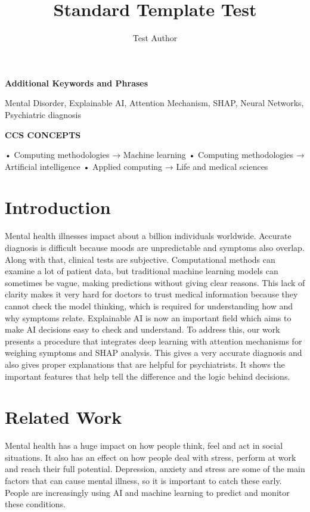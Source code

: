 \documentclass{article}
\begin{document}
\title{Standard Template Test}
\author{Test Author}
\maketitle

\textbf{Additional Keywords and Phrases}

Mental Disorder, Explainable AI, Attention Mechanism, SHAP, Neural Networks, Psychiatric diagnosis

\textbf{CCS CONCEPTS}

• Computing methodologies → Machine learning • Computing methodologies → Artificial intelligence • Applied computing → Life and medical sciences

\section{Introduction}

Mental health illnesses impact about a billion individuals worldwide. Accurate diagnosis is difficult because moods are unpredictable and symptoms also overlap. Along with that, clinical tests are subjective. Computational methods can examine a lot of patient data, but traditional machine learning models can sometimes be vague, making predictions without giving clear reasons. This lack of clarity makes it very hard for doctors to trust medical information because they cannot check the model thinking, which is required for understanding how and why symptoms relate. Explainable AI is now an important field which aims to make AI decisions easy to check and understand. To address this, our work presents a procedure that integrates deep learning with attention mechanisms for weighing symptoms and SHAP analysis. This gives a very accurate diagnosis and also gives proper explanations that are helpful for psychiatrists. It shows the important features that help tell the difference and the logic behind decisions.

\section{Related Work}

Mental health has a huge impact on how people think, feel and act in social situations. It also has an effect on how people deal with stress, perform at work and reach their full potential. Depression, anxiety and stress are some of the main factors that can cause mental illness, so it is important to catch these early. People are increasingly using AI and machine learning to predict and monitor these conditions.
\end{document}
